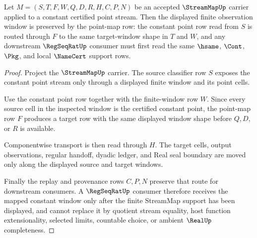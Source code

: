 \begin{theorem}
\label{thm:stream-map-constant-window-stability}
Let $M=(S,T,F,W,Q,D,R,H,C,P,N)$ be an accepted $\StreamMapUp$ carrier applied to a constant certified point stream. Then the displayed finite observation window is preserved by the point-map row: the constant point row read from $S$ is routed through $F$ to the same target-window shape in $T$ and $W$, and any downstream $\RegSeqRatUp$ consumer must first read the same $\hsame$, $\Cont$, $\Pkg$, and local $\NameCert$ support rows.
\end{theorem}
\begin{proof}
Project the $\StreamMapUp$ carrier. The source classifier row $S$ exposes the constant point stream only through a displayed finite window and its point cells.

Use the constant point row together with the finite-window row $W$. Since every source cell in the inspected window is the certified constant point, the point-map row $F$ produces a target row with the same displayed window shape before $Q,D,$ or $R$ is available.

Componentwise transport is then read through $H$. The target cells, output observations, regular handoff, dyadic ledger, and Real seal boundary are moved only along the displayed source and target windows.

Finally the replay and provenance rows $C,P,N$ preserve that route for downstream consumers. A $\RegSeqRatUp$ consumer therefore receives the mapped constant window only after the finite StreamMap support has been displayed, and cannot replace it by quotient stream equality, host function extensionality, selected limits, countable choice, or ambient $\RealUp$ completeness.
\end{proof}


